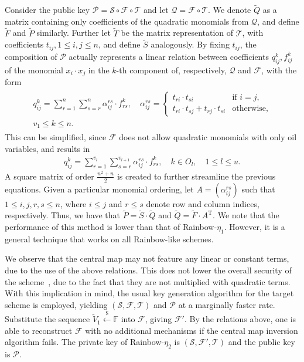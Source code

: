 \documentclass[draft, 12pt, a4paper, oneside]{memoir}
\newcommand{\random}{\stackrel{\$}{\longleftarrow}}
\theoremstyle{definition}
\theoremstyle{remark}
\begin{document}
Consider the public key
$\mathcal{P} = \mathcal{S} \circ \mathcal{F} \circ \mathcal{T}$ and let
$\mathcal{Q} = \mathcal{F} \circ \mathcal{T}$. We denote $\widetilde{Q}$ as a
matrix containing only coefficients of the quadratic monomials from
$\mathcal{Q}$, and define $\widetilde{F}$ and $\widetilde{P}$ similarly.
Further let $\widetilde{T}$ be the matrix representation of $\mathcal{T}$, with
coefficients $t_{ij}, 1 \leq i, j \leq n$, and define $\widetilde{S}$
analogously. By fixing $t_{ij}$, the composition of $\mathcal{P}$ actually
represents a linear relation between coefficients $q_{ij}^{k}, f_{ij}^{k}$ of
the monomial $x_{i} \cdot x_{j}$ in the $k$-th component of, respectively,
$\mathcal{Q}$ and $\mathcal{F}$, with the form
\begin{align}
  \begin{split}
    q_{ij}^{k} = \sum_{r = 1}^{n} \sum_{s = r}^{n}
      \alpha_{ij}^{rs} \cdot f_{rs}^{k}, \quad
      \alpha_{ij}^{rs} = \begin{cases}
        t_{ri} \cdot t_{si}                         & \text{if } i = j, \\
        t_{ri} \cdot t_{sj} + t_{rj} \cdot t_{si}   & \text{otherwise},
      \end{cases} \\
      v_{1} \leq k \leq n.
  \end{split}
\end{align}
This can be simplified, since $\mathcal{F}$ does not allow quadratic monomials
with only oil variables, and results in
\begin{align}
  q_{ij}^{k} = \sum_{r = 1}^{v_{l}} \sum_{s = r}^{v_{l + 1}}
    \alpha_{ij}^{rs} \cdot f_{rs}^{k},
      \quad k \in O_{l}, \quad 1 \leq l \leq u.
\end{align}
A square matrix of order $\frac{n^{2} + n}{2}$ is created to further streamline
the previous equations. Given a particular monomial ordering, let
$A = (\alpha_{ij}^{rs})$ such that $1 \leq i, j, r, s \leq n$, where
$i \leq j$ and $r \leq s$ denote row and column indices, respectively. Thus, we
have that $\widetilde{P} = \widetilde{S} \cdot \widetilde{Q}$ and
$\widetilde{Q} = \widetilde{F} \cdot A^{\text{T}}$. We note that the
performance of this method is lower than that of Rainbow-$\eta_{1}$. However,
it is a general technique that works on all Rainbow-like schemes.

We observe that the central map may not feature any linear or constant terms, due
to the use of the above relations. This does not lower the overall security of
the scheme~\cite{}, due to the fact that they are not multiplied with quadratic terms.
With this implication in mind, the usual key generation algorithm for the
target scheme is employed, yielding $(\mathcal{S}, \mathcal{F}, \mathcal{T})$
and $\mathcal{P}$ at a marginally faster rate. Substitute the sequence
$\widetilde{V}_{1} \random{} \mathbb{F}$ into $\mathcal{F}$, giving
$\mathcal{F'}$. By the relations above, one is able to reconstruct
$\mathcal{F}$ with no additional mechanisms if the central map inversion
algorithm fails. The private key of Rainbow-$\eta_{2}$ is
$(\mathcal{S}, \mathcal{F}', \mathcal{T})$ and the public key is $\mathcal{P}$.
\end{document}
